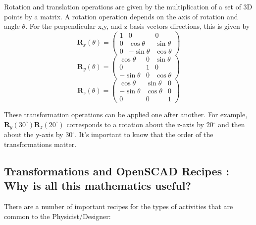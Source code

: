 Rotation and translation operations are given by the multiplication of a set of 3D points by a matrix. A rotation operation depends on the axis of rotation and angle $\theta$. For the perpendicular x,y, and z basis vectors directions, this is given by 
\begin{equation}
 \textbf{R}_{x} \left( \theta \right)= \begin{pmatrix} 1 & 0 & 0 \\ 0 & \cos \theta & \sin \theta \\ 0 & -\sin \theta & \cos\theta \end{pmatrix} 
\end{equation}
\begin{equation}
 \textbf{R}_{y} \left( \theta \right) = \begin{pmatrix} \cos \theta & 0 & \sin \theta \\ 0 & 1 & 0 \\ -\sin \theta & 0 & \cos\theta \end{pmatrix} 
\end{equation}
\begin{equation}
 \textbf{R}_{z} \left( \theta \right) = \begin{pmatrix} \cos \theta & \sin \theta & 0 \\  -\sin \theta & \cos\theta & 0 \\  0 & 0 & 1  \end{pmatrix} 
\end{equation}

These transformation operations can be applied one after another. For example, $\textbf{R}_{y} \left( 30^{\circ} \right)\textbf{R}_{z} \left( 20^{\circ} \right)$ corresponds to a rotation about the z-axis by 20$^{\circ}$ and then about the y-axis by 30$^{\circ}$. It's important to know that the order of the transformations matter. 


\subsection{Transformations and OpenSCAD Recipes : Why is all this mathematics useful?}

There are a number of important recipes for the types of activities that are common to the Physicist/Designer: 


